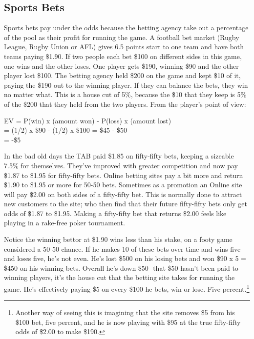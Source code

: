 \subsection*{Sports Bets}
Sports bets pay under the odds because the betting agency take out a
percentage of the pool as their profit for running the game. A
football bet market (Rugby League, Rugby Union or AFL) gives 6.5
points start to one team and have both teams paying \$1.90. If two
people each bet \$100 on different sides in this game, one wins and
the other loses. One player gets \$190, winning \$90 and the other
player lost \$100. The betting agency held \$200 on the game and kept
\$10 of it, paying the \$190 out to the winning player. If they can
balance the bets, they win no matter what. This is a house cut of 5\%,
because the \$10 that they keep is 5\% of the \$200 that they held from
the two players. From the player's point of view:

EV = P(win) x (amount won) - P(loss) x (amount lost) \\
   = (1/2) x \$90 - (1/2) x \$100  = \$45 - \$50  \\
   = -\$5

In the bad old days
the TAB paid \$1.85 on fifty-fifty bets, keeping a sizeable 7.5\% for
themselves. They've improved with greater competition and now pay
\$1.87 to \$1.95 for fifty-fifty bets. Online betting sites pay a bit
more and return \$1.90 to \$1.95 or more for 50-50 bets. Sometimes as
a promotion an Online site will pay \$2.00 on both sides of a
fifty-fifty bet. This is normally done to attract new customers to the
site; who then find that their future fifty-fifty bets only get odds
of \$1.87 to \$1.95. Making a fifty-fifty bet that returns \$2.00 feels like
playing in a rake-free poker tournament.


Notice the winning bettor at \$1.90 wins less than his stake,
on a footy game considered a 50-50 chance. If he makes 10 of these
bets over time and wins five and loses five, he's not even. He's lost
\$500 on his losing bets and won \$90 x 5 = \$450 on his winning bets.
Overall he's down \$50- that \$50 hasn't been paid to winning players,
it's the house cut that the betting site takes for running the game.
He's effectively paying \$5 on every \$100 he bets, win or lose.
Five percent.\footnote{Another way of seeing this is imagining that the
site removes \$5 from his \$100 bet, five percent, and he is now
playing with \$95 at the true fifty-fifty odds of \$2.00 to make \$190.}

